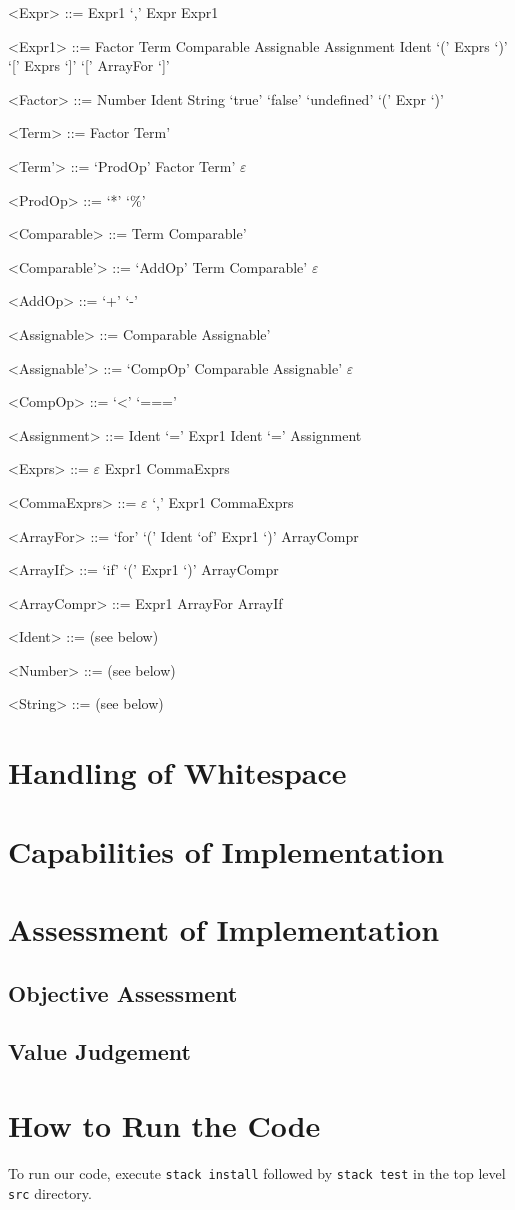 \documentclass{article}
\begin{document}
\begin{grammar}
	\let\syntleft\relax
	\let\syntright\relax
	
	<Expr> ::= Expr1 `,' Expr
	\alt Expr1

	<Expr1> ::= Factor
	\alt Term
	\alt Comparable
	\alt Assignable
	\alt Assignment
	\alt Ident `(' Exprs `)'
	\alt `[' Exprs `]'
	\alt `[' ArrayFor `]'
		
	<Factor> ::= Number
	\alt Ident
	\alt String
	\alt `true'
	\alt `false'
	\alt `undefined'
	\alt `(' Expr `)'
	
	<Term> ::= Factor Term'
	
	<Term'> ::= `ProdOp' Factor Term'
	\alt $\varepsilon$
	
	<ProdOp> ::= `*'
	\alt `\%'
	
	<Comparable> ::= Term Comparable'
	
	<Comparable'> ::= `AddOp' Term Comparable'
	\alt $\varepsilon$
	
	<AddOp> ::= `+'
	\alt `-'
	
	<Assignable> ::= Comparable Assignable'
	
	<Assignable'> ::= `CompOp' Comparable Assignable'
	\alt $\varepsilon$
	
	
	<CompOp> ::= `<'
	\alt `==='
	
	<Assignment> ::= Ident `=' Expr1
	\alt Ident `=' Assignment %
	
	<Exprs> ::= $\varepsilon$
	\alt Expr1 CommaExprs	
	
	<CommaExprs> ::= $\varepsilon$
	\alt `,' Expr1 CommaExprs
	
	<ArrayFor> ::= `for' `(' Ident `of' Expr1 `)' ArrayCompr
	
	<ArrayIf> ::= `if' `(' Expr1 `)' ArrayCompr
	
	<ArrayCompr> ::= Expr1
	\alt ArrayFor
	\alt ArrayIf
	
	<Ident> ::= (see below)
	
	<Number> ::= (see below)
	
	<String> ::= (see below)
\end{grammar}


\section{Handling of Whitespace}


\section{Capabilities of Implementation}


\section{Assessment of Implementation}
\subsection{Objective Assessment}


\subsection{Value Judgement}


\section{How to Run the Code}
To run our code, execute \texttt{stack install} followed by \texttt{stack test} in the top level \texttt{src} directory.
\end{document}
